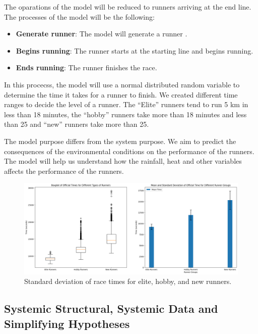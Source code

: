 \documentclass[conference]{IEEEtran}
\begin{document}
The oparations of the model will be reduced to runners arriving at the end line. The processes of the model will be the following:
\begin{itemize}
    \item \textbf{Generate runner}: The model will generate a runner .
    \item \textbf{Begins running}: The runner starts at the starting line and begins running.
    \item \textbf{Ends running}: The runner finishes the race.
\end{itemize}

In this procecss, the model will use a normal distributed random variable to determine the time it takes for a runner to finish. We created different time ranges to decide the level of a runner. The ``Elite'' runners tend to run 5 km in less than 18 minutes, the ``hobby'' runners take more than 18 minutes and less than 25 and ``new'' runners take more than 25.

The model purpose differs from the system purpose. We aim to predict the consequences of the environmental conditions on the performance of the runners. The model will help us understand how the rainfall, heat and other variables affects the performance of the runners.
\begin{figure}[htbp]
\centerline{\includegraphics[width=\linewidth]{figs/elite_hobby_new_standar_deviation.png}}
\caption{Standard deviation of race times for elite, hobby, and new runners.}
\label{fig:elite_hobby_new_standar_deviation}
\end{figure}


\subsection{Systemic Structural, Systemic Data and Simplifying Hypotheses}
\end{document}

